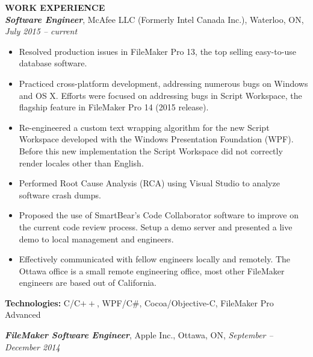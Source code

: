 \documentclass[10pt,letterpaper]{article}
\newcommand{\job}[4]
{
    \emph{\textbf{#1}}, #2, #3, \emph{#4}
}
\begin{document}
\vspace{0.5em}
\textbf{WORK EXPERIENCE} \hrulefill \\[0.5em]
\job{Software Engineer}{McAfee LLC (Formerly Intel Canada Inc.)}{Waterloo, ON}{July 2015 -- current}\\
\begin{adjustwidth}{0.1in}{0.5in}
    \begin{itemize}
    \item Resolved production issues in FileMaker Pro 13, the top selling easy-to-use database software.
    \item Practiced cross-platform development, addressing numerous bugs on Windows and OS X. Efforts were focused on addressing bugs in Script Workspace, the flagship feature in FileMaker Pro 14 (2015 release).
    \item Re-engineered a custom text wrapping algorithm for the new Script Workspace developed with the Windows Presentation Foundation (WPF). Before this new implementation the Script Workspace did not correctly render locales other than English.
    \item Performed Root Cause Analysis (RCA) using Visual Studio to analyze software crash dumps.
    \item Proposed the use of SmartBear's Code Collaborator software to improve on the current code review process. Setup a demo server and presented a live demo to local management and engineers.
    \item Effectively communicated with fellow engineers locally and remotely. The Ottawa office is a small remote engineering office, most other FileMaker engineers are based out of California.
    \end{itemize}
    \vspace{0.5em}
    \textbf{Technologies:} C/C$++$, WPF/C\#, Cocoa/Objective-C, FileMaker Pro Advanced
\end{adjustwidth}
\vspace{0.8em}
\job{FileMaker Software Engineer}{Apple Inc.}{Ottawa, ON}{September -- December  2014}\\
\end{document}
